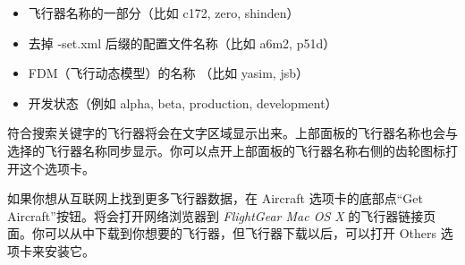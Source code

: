 \ifchinese
\begin{itemize}
\item 飞行器名称的一部分（比如 c172, zero, shinden）
\item 去掉 -set.xml 后缀的配置文件名称（比如 a6m2, p51d）
\item FDM（飞行动态模型）的名称 （比如 yasim, jsb）
\item 开发状态（例如 alpha, beta, production, development）
\end{itemize}
符合搜索关键字的飞行器将会在文字区域显示出来。上部面板的飞行器名称也会与选择的飞行器名称同步显示。你可以点开上部面板的飞行器名称右侧的齿轮图标打开这个选项卡。

如果你想从互联网上找到更多飞行器数据，在 Aircraft 选项卡的底部点“Get Aircraft”按钮。将会打开网络浏览器到 \textit{FlightGear Mac OS X} 的飞行器链接页面。你可以从中下载到你想要的飞行器，但飞行器下载以后，可以打开 Others 选项卡来安装它。

